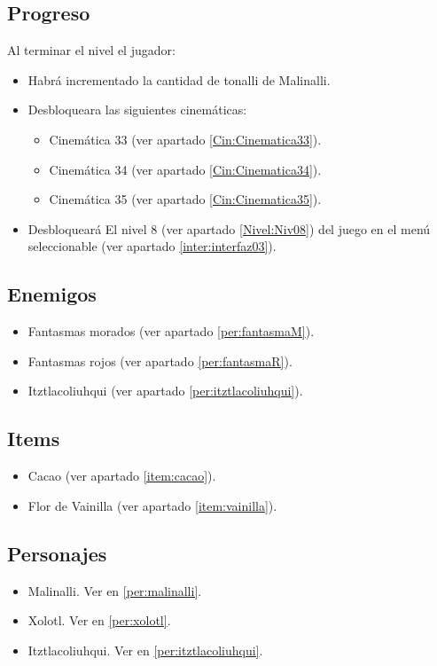 	\subsection{Progreso}
	Al terminar el nivel el jugador:
\begin{itemize}
        \item Habrá incrementado la cantidad de tonalli de Malinalli. 
        \item Desbloqueara las siguientes cinemáticas:
\begin{itemize}
        \item Cinemática 33 (ver apartado \ref{Cin:Cinematica33}). 
        \item Cinemática 34 (ver apartado \ref{Cin:Cinematica34}).
        \item Cinemática 35 (ver apartado \ref{Cin:Cinematica35}).
\end{itemize}
        \item Desbloqueará El nivel 8 (ver apartado  \ref{Nivel:Niv08}) del juego en el menú seleccionable (ver apartado \ref{inter:interfaz03}).
\end{itemize} 
	\subsection{Enemigos}
	\begin{itemize}
		\item Fantasmas morados (ver apartado \ref{per:fantasmaM}).
		\item Fantasmas rojos (ver apartado \ref{per:fantasmaR}).
		\item Itztlacoliuhqui (ver apartado \ref{per:itztlacoliuhqui}).
	\end{itemize}
	\subsection{Items}
\begin{itemize}
        \item   Cacao (ver apartado \ref{item:cacao}).
        \item Flor de Vainilla (ver apartado \ref{item:vainilla}).
\end{itemize}
	\subsection{Personajes}
	\begin{itemize}
		\item Malinalli. Ver en \ref{per:malinalli}.
		
		\item Xolotl. Ver en \ref{per:xolotl}.
		
		\item Itztlacoliuhqui. Ver en \ref{per:itztlacoliuhqui}.
	\end{itemize}
